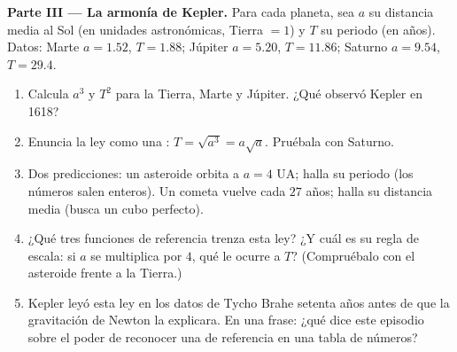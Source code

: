 \begin{problem}
\medskip
\noindent\textbf{Parte III --- La armonía de Kepler.}
Para cada planeta, sea $a$ su distancia media al Sol (en unidades
astronómicas, Tierra $= 1$) y $T$ su periodo (en años). Datos: Marte
$a = 1.52$, $T = 1.88$; Júpiter $a = 5.20$, $T = 11.86$; Saturno
$a = 9.54$, $T = 29.4$.
\begin{enumerate}[resume]
  \item Calcula $a^3$ y $T^2$ para la Tierra, Marte y Júpiter. ¿Qué
        observó Kepler en 1618?
  \item Enuncia la ley como una : $T = \sqrt{a^3} = a\sqrt a$.
        Pruébala con Saturno.
  \item Dos predicciones: un asteroide orbita a $a = 4$ UA; halla su
        periodo (los números salen enteros). Un cometa vuelve cada $27$
        años; halla su distancia media (busca un cubo perfecto).
  \item ¿Qué tres funciones de referencia trenza esta ley? ¿Y cuál es su
        regla de escala: si $a$ se multiplica por $4$, qué le ocurre a
        $T$? (Compruébalo con el asteroide frente a la Tierra.)
  \item Kepler leyó esta ley en los datos de Tycho Brahe setenta años
        antes de que la gravitación de Newton la explicara. En una frase:
        ¿qué dice este episodio sobre el poder de reconocer una  de
        referencia en una tabla de números?
\end{enumerate}


\end{problem}
